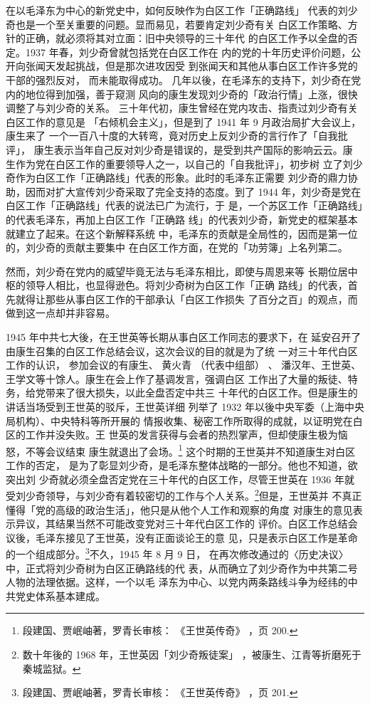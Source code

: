 在以毛泽东为中心的新党史中，如何反映作为白区工作「正确路线」
代表的刘少奇也是一个至关重要的问题。显而易见，若要肯定刘少奇有关
白区工作策略、方针的正确，就必须将其对立面：旧中央领导的三十年代
的白区工作予以全盘的否定。1937 年春，刘少奇曾就包括党在白区工作在
内的党的十年历史评价问题，公开向张闻天发起挑战，但是那次进攻因受
到张闻天和其他从事白区工作许多党的干部的强烈反对，
而未能取得成功。
几年以後，在毛泽东的支持下，刘少奇在党内的地位得到加强，善于窥测
风向的康生发现刘少奇的「政治行情」上涨，很快调整了与刘少奇的关系。
三十年代初，康生曾经在党内攻击、指责过刘少奇有关白区工作的意见是
「右倾机会主义」，但是到了 1941 年 9 月政治局扩大会议上，康生来了
一个一百八十度的大转弯，竟对历史上反刘少奇的言行作了「自我批评」，
康生表示当年自己反对刘少奇是错误的，是受到共产国际的影响云云。康
 生作为党在白区工作的重要领导人之一，以自己的「自我批评」，初步树
立了刘少奇作为白区工作「正确路线」代表的形象。此时的毛泽东正需要
刘少奇的鼎力协助，因而对扩大宣传刘少奇采取了完全支持的态度。到了
1944 年，刘少奇是党在白区工作「正确路线」代表的说法已广为流行，于
是，一个苏区工作「正确路线」的代表毛泽东，再加上白区工作「正确路
线」的代表刘少奇，新党史的框架基本就建立了起来。在这个新解释系统
中，毛泽东的贡献是全局性的，因而是第一位的，刘少奇的贡献主要集中
在白区工作方面，在党的「功劳簿」上名列第二。

然而，刘少奇在党内的威望毕竟无法与毛泽东相比，即使与周恩来等
长期位居中枢的领导人相比，也显得逊色。将刘少奇树为白区工作「正确
路线」的代表，首先就得让那些从事白区工作的干部承认「白区工作损失
了百分之百」的观点，而做到这一点却并非容易。

1945 年中共七大後，在王世英等长期从事白区工作同志的要求下，在
延安召开了由康生召集的白区工作总结会议，这次会议的目的就是为了统
一对三十年代白区工作的认识，
参加会议的有康生、
黄火青
（代表中组部）
、
潘汉年、王世英、王学文等十馀人。康生在会上作了基调发言，强调白区
工作出了大量的叛徒、特务，给党带来了很大损失，以此全盘否定中共三
十年代的白区工作。但是康生的讲话当场受到王世英的驳斥，王世英详细
列举了 1932 年以後中央军委（上海中央局机构）、中央特科等所开展的
情报收集、秘密工作所取得的成就，以证明党在白区的工作并没失败。王
世英的发言获得与会者的热烈掌声，但却使康生极为恼怒，不等会议结束
康生就退出了会场。\footnote{段建国、贾岷岫著，罗青长审核：
《王世英传奇》
，页 200.} 这个时期的王世英并不知道康生对白区工作的否定，
是为了彰显刘少奇，是毛泽东整体战略的一部分。他也不知道，欲突出刘
少奇就必须全盘否定党在三十年代的白区工作，尽管王世英在 1936 年就
受刘少奇领导，与刘少奇有着较密切的工作与个人关系。\footnote{数十年後的 1968 年，王世英因「刘少奇叛徒案」
，被康生、江青等折磨死于秦城监狱。}但是，王世英并
不真正懂得「党的高级的政治生活」，他只是从他个人工作和观察的角度
对康生的意见表示异议，其结果当然不可能改变党对三十年代白区工作的
评价。白区工作总结会议後，毛泽东接见了王世英，没有正面谈论王的意
见，只是表示白区工作是革命的一个组成部分。\footnote{段建国、贾岷岫著，罗青长审核：
《王世英传奇》
，页 201.}不久，1945 年 8 月 9 日，
在再次修改通过的〈历史决议〉中，正式将刘少奇树为白区正确路线的代
表，从而确立了刘少奇作为中共第二号人物的法理依据。这样，一个以毛
泽东为中心、以党内两条路线斗争为经纬的中共党史体系基本建成。

